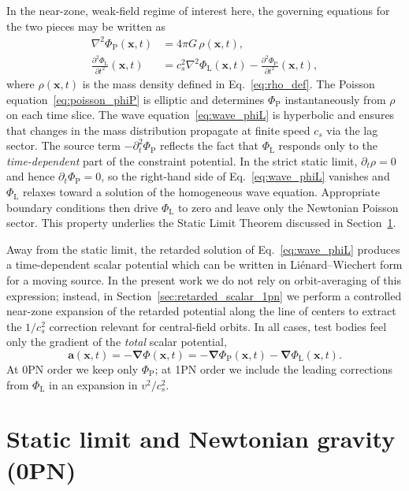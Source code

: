 \documentclass[11pt]{article}
\newcommand{\cS}{c_s}
\newcommand{\PhiP}{\Phi_{\mathrm{P}}}
\newcommand{\PhiL}{\Phi_{\mathrm{L}}}
\begin{document}
In the near-zone, weak-field regime of interest here, the governing equations for the two pieces may be written as
\begin{align}
  \nabla^2 \PhiP(\mathbf{x},t)
  &= 4\pi G\,\rho(\mathbf{x},t),
  \label{eq:poisson_phiP}
  \\
  \frac{\partial^2 \PhiL}{\partial t^2}(\mathbf{x},t)
  &= \cS^2 \nabla^2 \PhiL(\mathbf{x},t)
   - \frac{\partial^2 \PhiP}{\partial t^2}(\mathbf{x},t),
  \label{eq:wave_phiL}
\end{align}
where $\rho(\mathbf{x},t)$ is the mass density defined in Eq.~\eqref{eq:rho_def}. The Poisson equation~\eqref{eq:poisson_phiP} is elliptic and determines $\PhiP$ instantaneously from $\rho$ on each time slice. The wave equation~\eqref{eq:wave_phiL} is hyperbolic and ensures that changes in the mass distribution propagate at finite speed $\cS$ via the lag sector. The source term $-\partial_t^2 \PhiP$ reflects the fact that $\PhiL$ responds only to the \emph{time-dependent} part of the constraint potential. In the strict static limit, $\partial_t \rho = 0$ and hence $\partial_t \PhiP = 0$, so the right-hand side of Eq.~\eqref{eq:wave_phiL} vanishes and $\PhiL$ relaxes toward a solution of the homogeneous wave equation. Appropriate boundary conditions then drive $\PhiL$ to zero and leave only the Newtonian Poisson sector. This property underlies the Static Limit Theorem discussed in Section~\ref{sec:static_0PN}.

Away from the static limit, the retarded solution of Eq.~\eqref{eq:wave_phiL} produces a time-dependent scalar potential which can be written in Liénard--Wiechert form for a moving source. In the present work we do not rely on orbit-averaging of this expression; instead, in Section~\ref{sec:retarded_scalar_1pn}
we perform a controlled near-zone expansion of the retarded potential along
the line of centers to extract the $1/\cS^2$ correction relevant for
central-field orbits. In all cases, test bodies feel only the gradient of the \emph{total} scalar potential,
\begin{equation}
  \mathbf{a}(\mathbf{x},t)
  = -\bm{\nabla} \Phi(\mathbf{x},t)
  = -\bm{\nabla} \PhiP(\mathbf{x},t) - \bm{\nabla} \PhiL(\mathbf{x},t).
\end{equation}
At 0PN order we keep only $\PhiP$; at 1PN order we include the leading corrections from $\PhiL$ in an expansion in $v^2/\cS^2$.

\section{Static limit and Newtonian gravity (0PN)}
\label{sec:static_0PN}
\end{document}
